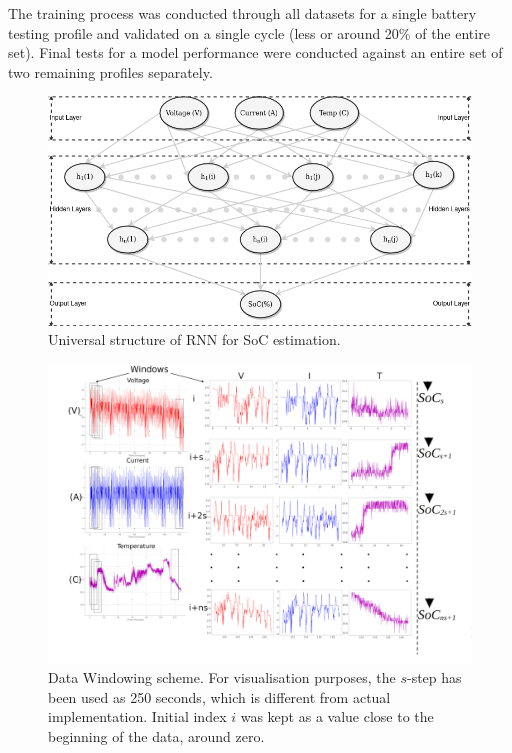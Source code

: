 %
%
The training process was conducted through all datasets for a single battery testing profile and validated on a single cycle (less or around 20\% of the entire set).
Final tests for a model performance were conducted against an entire set of two remaining profiles separately.
\begin{figure}[htbp]
    \centering
    \includegraphics[width=\linewidth]{II_Body/images/SoC-RNN.png}
    \caption{Universal structure of RNN for SoC estimation.}
    \label{fig:RNN-structure}
\end{figure}
\begin{landscape}
    \begin{figure}[ht]
        \centering
        \includegraphics[width=\linewidth]{II_Body/images/windowing3f-A3.jpg}
        \caption{Data Windowing scheme. For visualisation purposes, the $s$-step has been used as 250 seconds, which is different from actual implementation. Initial index $i$ was kept as a value close to the beginning of the data, around zero.}
        \label{fig:Windowing3f}
    \end{figure}
\end{landscape}
%
%
